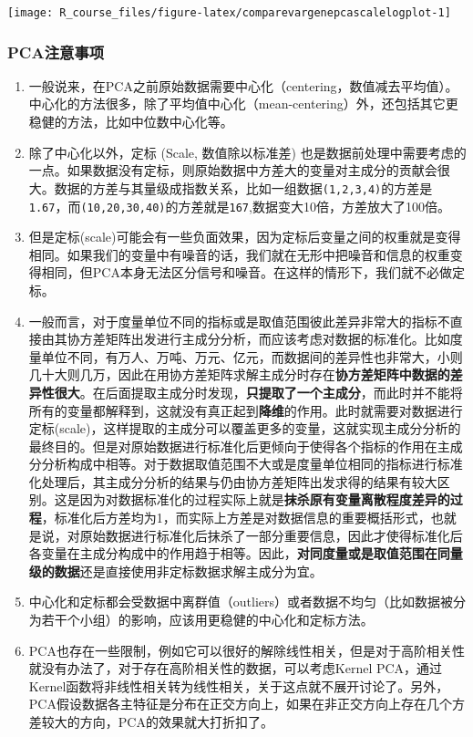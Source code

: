 \documentclass[]{article}
\numberwithin{figure}{section}
\numberwithin{table}{section}
\theoremstyle{definition}
\theoremstyle{definition}
\theoremstyle{definition}
\theoremstyle{remark}
\begin{document}
\begin{center}\texttt{[image: R\_course\_files/figure-latex/comparevargenepcascalelogplot-1]} \end{center}

\subsubsection{PCA注意事项}\label{pca}

\begin{enumerate}
\def\labelenumi{\arabic{enumi}.}
\item
  一般说来，在PCA之前原始数据需要中心化（centering，数值减去平均值）。中心化的方法很多，除了平均值中心化（mean-centering）外，还包括其它更稳健的方法，比如中位数中心化等。
\item
  除了中心化以外，定标 (Scale, 数值除以标准差)
  也是数据前处理中需要考虑的一点。如果数据没有定标，则原始数据中方差大的变量对主成分的贡献会很大。数据的方差与其量级成指数关系，比如一组数据\texttt{(1,2,3,4)}的方差是\texttt{1.67}，而\texttt{(10,20,30,40)}的方差就是\texttt{167},数据变大10倍，方差放大了100倍。
\item
  但是定标(scale)可能会有一些负面效果，因为定标后变量之间的权重就是变得相同。如果我们的变量中有噪音的话，我们就在无形中把噪音和信息的权重变得相同，但PCA本身无法区分信号和噪音。在这样的情形下，我们就不必做定标。
\item
  一般而言，对于度量单位不同的指标或是取值范围彼此差异非常大的指标不直接由其协方差矩阵出发进行主成分分析，而应该考虑对数据的标准化。比如度量单位不同，有万人、万吨、万元、亿元，而数据间的差异性也非常大，小则几十大则几万，因此在用协方差矩阵求解主成分时存在\textbf{协方差矩阵中数据的差异性很大}。在后面提取主成分时发现，\textbf{只提取了一个主成分}，而此时并不能将所有的变量都解释到，这就没有真正起到\textbf{降维}的作用。此时就需要对数据进行定标(scale)，这样提取的主成分可以覆盖更多的变量，这就实现主成分分析的最终目的。但是对原始数据进行标准化后更倾向于使得各个指标的作用在主成分分析构成中相等。对于数据取值范围不大或是度量单位相同的指标进行标准化处理后，其主成分分析的结果与仍由协方差矩阵出发求得的结果有较大区别。这是因为对数据标准化的过程实际上就是\textbf{抹杀原有变量离散程度差异的过程}，标准化后方差均为1，而实际上方差是对数据信息的重要概括形式，也就是说，对原始数据进行标准化后抹杀了一部分重要信息，因此才使得标准化后各变量在主成分构成中的作用趋于相等。因此，\textbf{对同度量或是取值范围在同量级的数据}还是直接使用非定标数据求解主成分为宜。
\item
  中心化和定标都会受数据中离群值（outliers）或者数据不均匀（比如数据被分为若干个小组）的影响，应该用更稳健的中心化和定标方法。
\item
  PCA也存在一些限制，例如它可以很好的解除线性相关，但是对于高阶相关性就没有办法了，对于存在高阶相关性的数据，可以考虑Kernel
  PCA，通过Kernel函数将非线性相关转为线性相关，关于这点就不展开讨论了。另外，PCA假设数据各主特征是分布在正交方向上，如果在非正交方向上存在几个方差较大的方向，PCA的效果就大打折扣了。
\end{enumerate}
\end{document}
